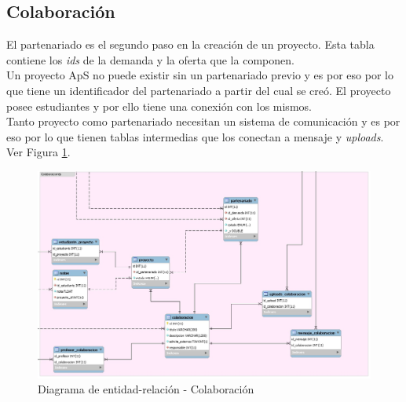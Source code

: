 \documentclass[11pt]{book}
\begin{document}
	\subsection{Colaboración}
	El partenariado es el segundo paso en la creación de un proyecto. Esta tabla contiene los \textit{ids} de la demanda y la oferta que la componen.\\
	Un proyecto ApS no puede existir sin un partenariado previo y es por eso por lo que tiene un identificador del partenariado a partir del cual se creó. El proyecto posee estudiantes y por ello tiene una conexión con los mismos.\\
	Tanto proyecto como partenariado necesitan un sistema de comunicación y es por eso por lo que tienen tablas intermedias que los conectan a mensaje y \textit{uploads}. Ver Figura \ref{fig:colaboracion}.
	\begin{landscape}
		\begin{figure}[p]
			\includegraphics[scale=0.6]{colaboracion}
			\caption{Diagrama de entidad-relación - Colaboración}
			\label{fig:colaboracion}
		\end{figure}
	\end{landscape}
\end{document}
